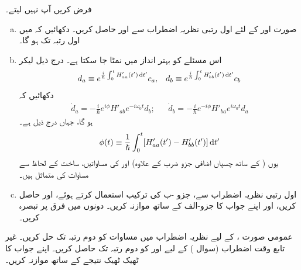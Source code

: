 فرض کریں آپ  نہیں لیتے۔
\begin{enumerate}[a.]
\item
  صورت   اور   کے لئے  اول رتبی  نظریہ اضطراب سے  اور  حاصل کریں۔ دکھائیں کہ  میں اول رتبہ  تک
       ہو گا۔
\item
 اس مسئلے  کو بہتر انداز میں  نمٹا  جا سکتا ہے۔ درج ذیل لیکر
\begin{align}
	d_a\equiv e^{\frac{i}{\hslash}\int_{0}^{t}H'_{aa}(t')\dif t'}c_a,&&d_b\equiv e^{\frac{i}{\hslash}\int_{0}^{t}H'_{bb}(t')\dif t'}c_b
\end{align}
دکھائیں کہ
\begin{align}
	\dot{d}_a=-\frac{i}{\hslash}e^{i\phi}H'_{ab}e^{-i\omega_0t}d_b;&&\dot{d}_b=-\frac{i}{\hslash}e^{-i\phi}H'_{ba}e^{i\omega_0t}d_a
\end{align}
ہو گا، جہاں درج ذیل ہے۔
\begin{align}
	\phi(t)\equiv\frac{1}{\hslash}\int_{0}^{t}[H'_{aa}(t')-H'_{bb}(t')]\dif t'
\end{align}
یوں (  کے ساتھ چسپاں  اضافی جزو ضرب   کے علاوہ)    اور  کی مساواتیں،   ساخت کے لحاظ سے  مساوات   کی  متماثل ہیں۔
\item
 اول رتبی  نظریہ اضطراب سے،  جزو -ب  کی ترکیب استعمال کرتے ہوئے،   اور  حاصل کریں، اور  اپنے جواب کا جزو-الف  کے ساتھ موازنہ کریں۔ دونوں میں فرق پر تبصرہ کریں۔
 \end{enumerate}
عمومی صورت ،     کے لیے نظریہ اضطراب  میں  مساوات   کو  دوم رتبہ  تک حل کریں۔
غیر تابع وقت اضطراب   (سوال )   کے لیے  اور  کو  دوم رتبہ  تک حاصل کریں۔ اپنے جواب کا  ٹھیک ٹھیک  نتیجے  کے ساتھ موازنہ کریں۔

